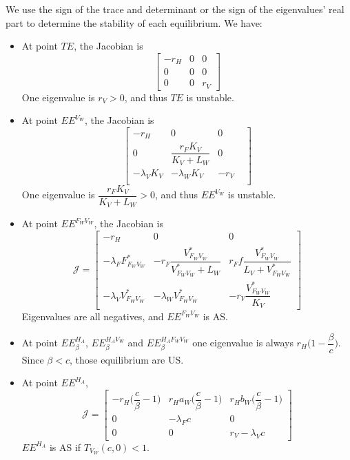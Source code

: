 \documentclass{article}
\newcommand{\lfw}{\lambda_{F}}
\newcommand{\lvw}{\lambda_{V}}
\newcommand{\lfv}{\lambda_{W}}
\begin{document}
We use the sign of the trace and determinant or the sign of the eigenvalues' real part to determine the stability of each equilibrium. We have:

\begin{itemize}
\item At point $TE$, the Jacobian is
$$
\begin{bmatrix}
-r_H & 0 & 0 \\
0 & 0 & 0  \\
0 & 0 & r_V
\end{bmatrix}
$$
One eigenvalue is $r_V > 0$, and thus $TE$ is unstable.

\item At point $EE^{V_W}$, the Jacobian is
$$
\begin{bmatrix}
-r_H & 0 & 0 \\
0 & \dfrac{r_F K_V}{K_V + L_W} & 0 \\
-\lvw K_V  & - \lfv K_V & -r_V & \\
\end{bmatrix}
$$
One eigenvalue is $\dfrac{r_F K_V}{K_V + L_W} > 0$, and thus $EE^{V_W}$ is unstable.

\item At point $EE^{F_WV_W}$, the Jacobian is
$$
\mathcal{J} =
\begin{bmatrix}
-r_H & 0 & 0 \\
-\lfw F_{F_WV_W}^* & -r_F \dfrac{V_{F_WV_W}^*}{V_{F_WV_W}^* +L_W}  & r_F f \dfrac{V_{F_WV_W}^*}{L_V + V_{F_WV_W}^*}\\
-\lvw V_{F_WV_W}^* & - \lfv V_{F_WV_W}^* & -r_V \dfrac{V_{F_WV_W}^*}{K_V}
\end{bmatrix}
$$
Eigenvalues are all negatives, and $EE^{F_WV_W}$ is AS.

\item At point $EE^{H_A}_\beta$, $EE^{H_AV_W}_\beta$ and $EE^{H_AF_WV_W}_\beta$ one eigenvalue is always $r_H \Big(1 - \dfrac{\beta}{c}\Big)$. Since $\beta < c$, those equilibrium are US.

\item At point $EE^{H_A}$,
\begin{equation}
\mathcal{J} =
\begin{bmatrix}
-r_H \Big(\dfrac{c}{\beta}-1\Big) & r_H a_W \Big(\dfrac{c}{\beta}-1\Big) & r_H b_W \Big(\dfrac{c}{\beta}-1\Big) \\
0 & - \lfw c  & 0 \\
0 & 0 & r_V - \lvw c
\end{bmatrix}
\end{equation}
$EE^{H_A}$ is AS if $T_{V_W}(c, 0) < 1$.



\end{itemize}
\end{document}
